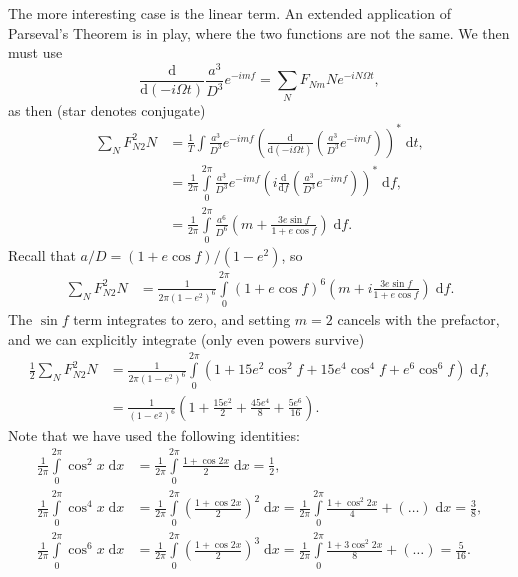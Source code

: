 \documentclass[11pt,
        usenames, %
        dvipsnames %
    ]{article}
\newcommand*{\rd}[2]{\frac{\mathrm{d}#1}{\mathrm{d}#2}}
\newcommand*{\p}[1]{\left(#1\right)}
\begin{document}
The more interesting case is the linear term. An extended application of
Parseval's Theorem is in play, where the two functions are not the same. We then
must use
\begin{equation}
    \rd{}{\p{-i \Omega t}}\frac{a^3}{D^3}e^{-imf}
        = \sum\limits_N F_{Nm} Ne^{-iN\Omega t},
\end{equation}
as then (star denotes conjugate)
\begin{align}
    \sum\limits_N F_{N2}^2 N &= \frac{1}{T}\int\limits
        \frac{a^3}{D^3}e^{-imf}
            \p{\rd{}{\p{-i \Omega t}}\p{\frac{a^3}{D^3}
                e^{-imf}}}^*\;\mathrm{d}t,\\
        &= \frac{1}{2\pi} \int\limits_0^{2\pi}
            \frac{a^3}{D^3}e^{-imf}
            \p{i\rd{}{f}\p{\frac{a^3}{D^3}
                e^{-imf}}}^*\;\mathrm{d}f,\\
        &= \frac{1}{2\pi} \int\limits_0^{2\pi}
            \frac{a^6}{D^6}\p{m + \frac{3e\sin f}{1 + e\cos f}}
                \;\mathrm{d}f.
\end{align}
Recall that $a/D = \p{1 + e\cos f} / \p{1 - e^2}$, so
\begin{align}
    \sum\limits_N F_{N2}^2 N
        &= \frac{1}{2\pi\p{1 - e^2}^6} \int\limits_0^{2\pi}
            \p{1 + e\cos f}^6\p{m + i\frac{3e\sin f}{1 + e\cos f}}
                \;\mathrm{d}f.
\end{align}
The $\sin f$ term integrates to zero, and setting $m = 2$ cancels with the
prefactor, and we can explicitly integrate (only even powers survive)
\begin{align}
    \frac{1}{2}\sum\limits_N F_{N2}^2N
        &= \frac{1}{2\pi\p{1 - e^2}^6}\int\limits_0^{2\pi}
            \p{1 + 15e^2\cos^2f + 15e^4\cos^4f
                + e^6\cos^6 f}\;\mathrm{d}f,\\
        &= \frac{1}{\p{1 - e^2}^6}\p{1 + \frac{15e^2}{2}
            + \frac{45 e^4}{8} + \frac{5e^6}{16}}.
\end{align}
Note that we have used the following identities:
\begin{align}
    \frac{1}{2\pi}\int\limits_0^{2\pi}\cos^2x\;\mathrm{d}x
        &= \frac{1}{2\pi}
            \int\limits_0^{2\pi}\frac{1 + \cos 2x}{2}\;\mathrm{d}x
        = \frac{1}{2},\\
    \frac{1}{2\pi}\int\limits_0^{2\pi}\cos^4x\;\mathrm{d}x
        &= \frac{1}{2\pi}
            \int\limits_0^{2\pi}\p{\frac{1 + \cos 2x}{2}}^2\;\mathrm{d}x
        = \frac{1}{2\pi}
            \int\limits_0^{2\pi}\frac{1 + \cos^2 2x}{4}
                + (\dots)\;\mathrm{d}x
        = \frac{3}{8},\\
    \frac{1}{2\pi}\int\limits_0^{2\pi}\cos^6x\;\mathrm{d}x
        &= \frac{1}{2\pi}
            \int\limits_0^{2\pi}\p{\frac{1 + \cos 2x}{2}}^3\;\mathrm{d}x
        = \frac{1}{2\pi}
            \int\limits_0^{2\pi}\frac{1 + 3\cos^2 2x}{8}
                 + (\dots)
        = \frac{5}{16}.
\end{align}
\end{document}
